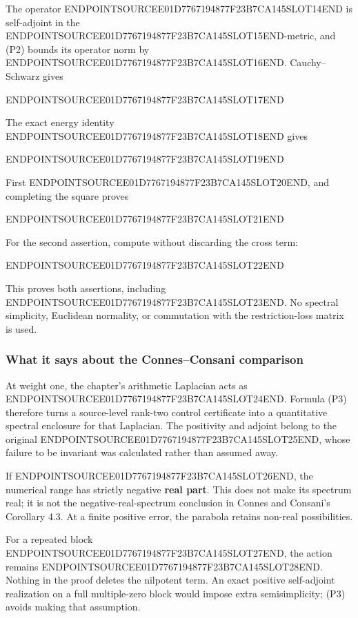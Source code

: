 The operator ENDPOINTSOURCEE01D7767194877F23B7CA145SLOT14END is self-adjoint in the ENDPOINTSOURCEE01D7767194877F23B7CA145SLOT15END-metric, and (P2) bounds its operator norm by ENDPOINTSOURCEE01D7767194877F23B7CA145SLOT16END. Cauchy--Schwarz gives

ENDPOINTSOURCEE01D7767194877F23B7CA145SLOT17END

The exact energy identity ENDPOINTSOURCEE01D7767194877F23B7CA145SLOT18END gives

ENDPOINTSOURCEE01D7767194877F23B7CA145SLOT19END

First ENDPOINTSOURCEE01D7767194877F23B7CA145SLOT20END, and completing the square proves

ENDPOINTSOURCEE01D7767194877F23B7CA145SLOT21END

For the second assertion, compute without discarding the cross term:

ENDPOINTSOURCEE01D7767194877F23B7CA145SLOT22END

This proves both assertions, including ENDPOINTSOURCEE01D7767194877F23B7CA145SLOT23END. No spectral simplicity, Euclidean normality, or commutation with the restriction-loss matrix is used.

\subsubsection{What it says about the Connes--Consani comparison}\label{endpoint-cc_laplacian--what-it-says-about-the-connesconsani-comparison}

At weight one, the chapter's arithmetic Laplacian acts as ENDPOINTSOURCEE01D7767194877F23B7CA145SLOT24END. Formula (P3) therefore turns a source-level rank-two control certificate into a quantitative spectral enclosure for that Laplacian. The positivity and adjoint belong to the original ENDPOINTSOURCEE01D7767194877F23B7CA145SLOT25END, whose failure to be invariant was calculated rather than assumed away.

If ENDPOINTSOURCEE01D7767194877F23B7CA145SLOT26END, the numerical range has strictly negative \textbf{real part}. This does not make its spectrum real; it is not the negative-real-spectrum conclusion in Connes and Consani's Corollary 4.3. At a finite positive error, the parabola retains non-real possibilities.

For a repeated block ENDPOINTSOURCEE01D7767194877F23B7CA145SLOT27END, the action remains ENDPOINTSOURCEE01D7767194877F23B7CA145SLOT28END. Nothing in the proof deletes the nilpotent term. An exact positive self-adjoint realization on a full multiple-zero block would impose extra semisimplicity; (P3) avoids making that assumption.

